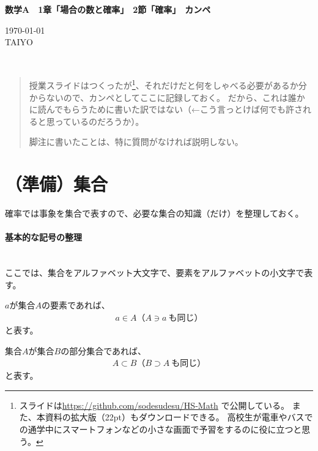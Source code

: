 \documentclass[luatexja,fontsize=12pt]{jlreq}\usepackage{ifthen}\newcounter{enlarge}\setcounter{enlarge}{1}
\newcommand{\LS}[2]{\ifthenelse{\value{enlarge}=2 \OR \value{enlarge}=3}{#1}{#2}}
\newcommand{\LO}[1]{\LS{#1}{\relax}}
\begin{document}
{\Large%
\noindent
\textbf{%
数学A　1章「場合の数と確率」　2節「確率」　カンペ
\LO{\\ \color{teal} 〈拡大版〉}}
}

\begin{flushleft}
\today \\
TAIYO
\end{flushleft}

{\footnotesize%
\mbox{}\\

}
\begin{quotation}
授業スライドはつくったが\footnote{%
スライドは\url{https://github.com/sodesudesu/HS-Math}
で公開している。
また、本資料の拡大版（22pt）もダウンロードできる。
高校生が電車やバスでの通学中にスマートフォンなどの小さな画面で予習をするのに役に立つと思う。}、それだけだと何をしゃべる必要があるか分からないので、カンペとしてここに記録しておく。
だから、これは誰かに読んでもらうために書いた訳ではない（←こう言っとけば何でも許されると思っているのだろうか）。

脚注に書いたことは、特に質問がなければ説明しない。
\end{quotation}

\section{（準備）集合}

確率では事象を集合で表すので、必要な集合の知識（だけ）を整理しておく。
\mbox{}\\

\paragraph{基本的な記号の整理}\mbox{}\\
\indent
ここでは、集合をアルファベット大文字で、要素をアルファベットの小文字で表す。

$a$が集合$A$の要素であれば、
\begin{align} \label{eq:0_1}
a \in A　（A \ni a~も同じ）
\end{align}
と表す。

集合$A$が集合$B$の部分集合であれば、
\begin{align} \label{eq:0_2}
A \subset B　（B \supset A~も同じ）
\end{align}
と表す。
\end{document}

